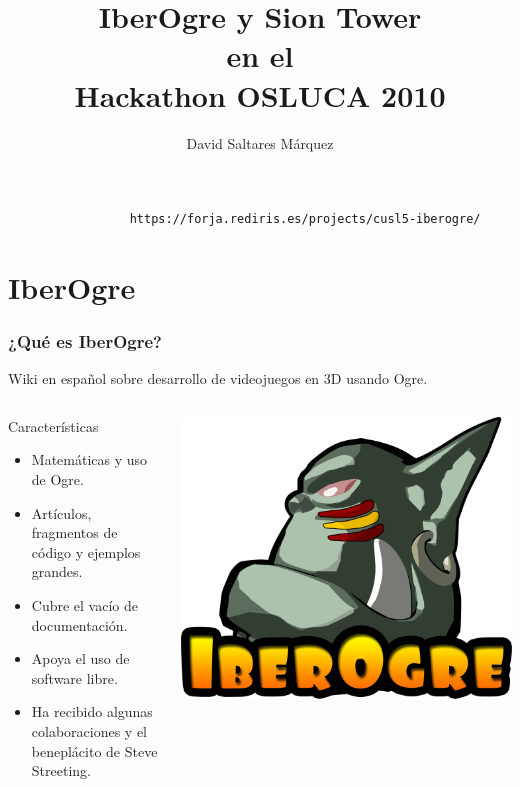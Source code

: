 \documentclass[green]{beamer}
\title{IberOgre y Sion Tower \\ en el \\ Hackathon OSLUCA 2010}
\author{David Saltares Márquez}
\begin{document}
\begin{frame}[fragile]
	\titlepage 
	
	{\scriptsize
	\begin{center}
	    \begin{verbatim}
	             https://forja.rediris.es/projects/cusl5-iberogre/
	    \end{verbatim}
	\end{center}
	}
\end{frame}

\section{IberOgre}

\begin{frame}
	\frametitle{¿Qué es IberOgre?}
    
    Wiki en español sobre desarrollo de videojuegos en 3D usando Ogre.
    
    \begin{columns}[c]
		\column{200pt}
        
		\begin{block}{Características}
            \begin{itemize}
                \item Matemáticas y uso de Ogre.
                \item Artículos, fragmentos de código y ejemplos grandes.
                \item Cubre el vacío de documentación.
                \item Apoya el uso de software libre.
                \item Ha recibido algunas colaboraciones y el beneplácito de Steve Streeting.
            \end{itemize}            
        \end{block}

		\column{100pt}
        
		\begin{center}
			\includegraphics[scale=0.08]{img/logo-iberogre.png}
		\end{center}
	\end{columns} 
\end{frame}
\end{document}
